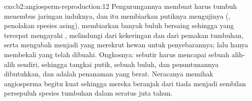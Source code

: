 \begin{solution}{exo:b2:angiosperm-reproduction:12}
Pengurungannya membuat  harus tumbuh menembus jaringan
induknya, dan itu membiarkan putiknya mengujinya (, penolakan spesies asing), membiarkan banyak buluh bersaing
sehingga yang tercepat mengayahi , melindungi  dari
kekeringan dan dari pemakan tumbuhan, serta mengubah 
menjadi  yang merekrut hewan untuk penyebarannya;  lalu hanya membekali  yang telah dibuahi. Ongkosnya:
sebutir  harus mencapai sebuah  alih-alih  sendiri, sehingga tangkai putik, sebuah buluh, dan
penuntunannya dibutuhkan, dan  adalah penanaman yang berat.
Neracanya memihak angiosperma begitu kuat sehingga mereka beranjak dari
tiada menjadi sembilan persepuluh spesies tumbuhan dalam seratus juta
tahun.
\end{solution}

